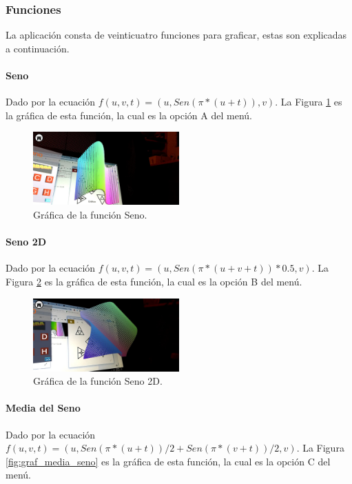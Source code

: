 \FloatBarrier

\subsubsection{Funciones} 
La aplicación consta de veinticuatro funciones para graficar, estas son explicadas a continuación.

\paragraph{Seno}
Dado por la ecuación $f(u,v,t)=(u,Sen(\pi * (u + t)),v)$. La Figura \ref{fig:graf_seno} es la gráfica de esta función, la cual es la opción A del menú.

\begin{figure}[hbt!]
\centering
\includegraphics[width=0.5\textwidth]{figuras/graficas/seno.png}
\caption{\label{fig:graf_seno}Gráfica de la función Seno.}
\end{figure}
\FloatBarrier

\paragraph{Seno 2D}
Dado por la ecuación $f(u,v,t)=(u,Sen(\pi * (u + v+ t))*0.5,v)$. La Figura \ref{fig:graf_seno2d} es la gráfica de esta función, la cual es la opción B del menú.

\begin{figure}[hbt!]
\centering
\includegraphics[width=0.5\textwidth]{figuras/graficas/seno2d.png}
\caption{\label{fig:graf_seno2d}Gráfica de la función Seno 2D.}
\end{figure}
\FloatBarrier

\paragraph{Media del Seno}
Dado por la ecuación $f(u,v,t)=(u,Sen(\pi * (u + t))/2+Sen(\pi * (v+ t))/2,v)$. La Figura \ref{fig:graf_media_seno} es la gráfica de esta función, la cual es la opción C del menú.

